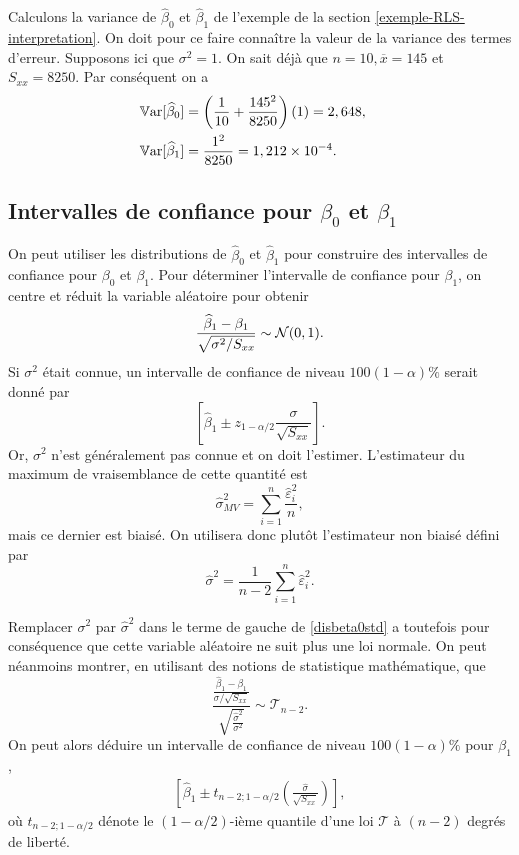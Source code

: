 \begin{exemple}
Calculons la variance de $\widehat\beta_0$ et $\widehat\beta_1$ de l'exemple de la section \ref{exemple-RLS-interpretation}. On doit pour ce faire connaître la valeur de la variance des termes d'erreur. Supposons ici que $\sigma^2=1$. On sait déjà que $n=10,\overline x=145$ et $S_{xx}=8250$. Par conséquent on a
\begin{align*}
    \mathbb{V}\text{ar}[\widehat\beta_0] &= \left( \frac{1}{10}+\frac{145^2}{8250} \right)(1)=2,648, \cr
    \mathbb{V}\text{ar}[\widehat\beta_1] &= \frac{1^2}{8250}=1,212\times 10^{-4}.
\end{align*}
\end{exemple}


\subsection{Intervalles de confiance pour $\beta_0$ et $\beta_1$}
\label{sec:IntervallesDeConfiance}

On peut utiliser les distributions de $\widehat{\beta}_0$ et $\widehat{\beta}_1$ pour construire des intervalles de confiance pour $\beta_0$ et $\beta_1$. Pour déterminer l'intervalle de confiance pour $\beta_1$, on centre et réduit la variable aléatoire pour obtenir
\begin{equation}
\frac{\widehat{\beta}_1-\beta_1}{\sqrt{\sigma^2/S_{xx}}}\sim \mathcal{N}(0,1).
\label{disbeta0std}
\end{equation}
\vspace{-0.05 in}
Si $\sigma^2$ était connue, un intervalle de confiance de niveau $100(1-\alpha)\%$ serait donné par 
$$\left[\widehat{\beta}_1\pm z_{1-\alpha/2} \frac{\sigma}{\sqrt{S_{xx}}} \right].$$ 
Or, $\sigma^2$ n'est généralement pas connue et on doit l'estimer. L'estimateur du maximum de vraisemblance de cette quantité est 
$$ \widehat{\sigma}_{MV}^2 = \sum_{i=1}^n \frac{\widehat{\varepsilon}_i^2}{n},$$ mais ce dernier est biaisé.
On utilisera donc plutôt l'estimateur non biaisé défini par $$\widehat{\sigma}^2=  \frac{1}{n-2} \sum_{i=1}^n \widehat{\varepsilon}_i^2.$$

\vspace{-0.05 in}
Remplacer $\sigma^2$ par $\widehat\sigma^2$ dans le terme de gauche de \eqref{disbeta0std} a toutefois pour conséquence que cette variable aléatoire ne suit plus une loi normale. On peut néanmoins montrer, en utilisant des notions de statistique mathématique, que
\begin{equation}
 \frac{\displaystyle\frac{\widehat{\beta}_1-\beta_1}{\displaystyle\sigma/\sqrt{S_{xx}}}}
 {  \sqrt{\frac{\displaystyle\widehat\sigma^2}{\displaystyle\sigma^2} } } \sim \mathcal{T}_{n-2}.
\label{disbeta0stds}
\end{equation}
On peut alors déduire un intervalle de confiance de niveau $100(1-\alpha)\%$ pour $\beta_1$,
\begin{eqnarray}
\left[\widehat{\beta}_1 \pm t_{n-2; 1-\alpha/2} \left(\frac{\widehat\sigma}{\sqrt{S_{xx}}}\right)\right],
\end{eqnarray}
où $t_{n-2; 1-\alpha/2}$ dénote le $(1-\alpha/2)$-ième quantile d'une loi $\mathcal{T}$ à $(n-2)$ degrés de liberté.\\

